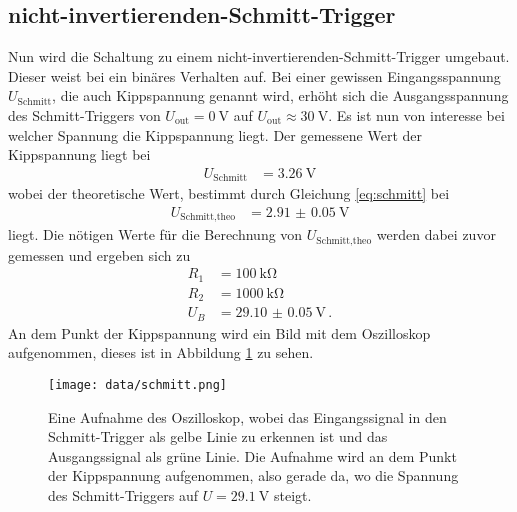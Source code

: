 \subsection{nicht-invertierenden-Schmitt-Trigger}
Nun wird die Schaltung zu einem nicht-invertierenden-Schmitt-Trigger umgebaut.
Dieser weist bei ein binäres Verhalten auf.
Bei einer gewissen Eingangsspannung $U_\text{Schmitt}$, die auch Kippspannung genannt wird, erhöht sich die Ausgangsspannung des Schmitt-Triggers von $U_\text{out}= \SI{0}{\V}$ auf $U_\text{out}\approx \SI{30}{\V}$.
Es ist nun von interesse bei welcher Spannung die Kippspannung liegt.
Der gemessene Wert der Kippspannung liegt bei 
\begin{align*}
    U_\text{Schmitt} &= \SI{3.26}{\V}
\end{align*}
wobei der theoretische Wert, bestimmt durch Gleichung \eqref{eq:schmitt} bei 
\begin{align*}
    U_\text{Schmitt,theo} &= \SI{2.91(5)}{\V}
\end{align*}
liegt.
Die nötigen Werte für die Berechnung von $ U_\text{Schmitt,theo}$ werden dabei zuvor gemessen und ergeben sich zu
\begin{align*}
    R_1 &= \SI{100}{\kilo\ohm}\\
    R_2 &= \SI{1000}{\kilo\ohm}\\
    U_B &= \SI{29.10(5)}{\V} \, .
\end{align*}
An dem Punkt der Kippspannung wird ein Bild mit dem Oszilloskop aufgenommen, dieses ist in Abbildung \ref{fig:schmitt_oszi} zu sehen.
\begin{figure}
    \centering
    \texttt{[image: data/schmitt.png]}
    \caption{Eine Aufnahme des Oszilloskop, wobei das Eingangssignal in den Schmitt-Trigger als gelbe Linie zu erkennen ist und das Ausgangssignal als grüne Linie.
    Die Aufnahme wird an dem Punkt der Kippspannung aufgenommen, also gerade da, wo die Spannung des Schmitt-Triggers auf $U=\SI{29.1}{\V}$ steigt.}
    \label{fig:schmitt_oszi}
\end{figure}
